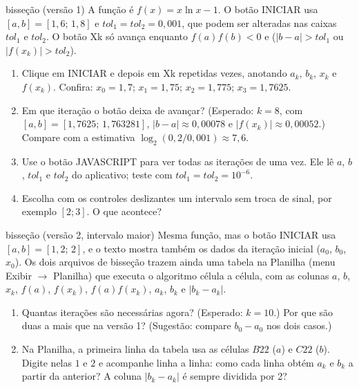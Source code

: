 \begin{atividade}{bisseção (versão 1)}{\arqBisA}
A função é $f(x)=x\ln x-1$. O botão INICIAR usa $[a,b]=[1{,}6;\,1{,}8]$ e
$tol_1=tol_2=0{,}001$, que podem ser alteradas nas caixas $tol_1$ e $tol_2$. O botão Xk só avança
enquanto $f(a)f(b)<0$ e ($|b-a|>tol_1$ ou $|f(x_k)|>tol_2$).
\begin{enumerate}[nosep]
  \item Clique em INICIAR e depois em Xk repetidas vezes, anotando $a_k$, $b_k$, $x_k$ e
        $f(x_k)$. Confira: $x_0=1{,}7$; $x_1=1{,}75$; $x_2=1{,}775$; $x_3=1{,}7625$.
  \item Em que iteração o botão deixa de avançar? (Esperado: $k=8$, com $[a,b]=[1{,}7625;\,1{,}763281]$,
        $|b-a|\approx0{,}00078$ e $|f(x_k)|\approx0{,}00052$.) Compare com a estimativa
        $\log_2(0{,}2/0{,}001)\approx7{,}6$.
  \item Use o botão JAVASCRIPT para ver todas as iterações de uma vez. Ele lê $a$, $b$, $tol_1$ e
        $tol_2$ do aplicativo; teste com $tol_1=tol_2=10^{-6}$.
  \item Escolha com os controles deslizantes um intervalo sem troca de sinal, por exemplo
        $[2;3]$. O que acontece?
\end{enumerate}
\end{atividade}

\begin{atividade}{bisseção (versão 2, intervalo maior)}{\arqBisB}
Mesma função, mas o botão INICIAR usa $[a,b]=[1{,}2;\,2]$, e o texto mostra também os dados da
iteração inicial ($a_0$, $b_0$, $x_0$). Os dois arquivos de bisseção trazem ainda uma tabela na
Planilha (menu Exibir $\to$ Planilha) que executa o algoritmo célula a célula, com as colunas
$a$, $b$, $x_k$, $f(a)$, $f(x_k)$, $f(a)f(x_k)$, $a_k$, $b_k$ e $|b_k-a_k|$.
\begin{enumerate}[nosep]
  \item Quantas iterações são necessárias agora? (Esperado: $k=10$.) Por que são duas a mais que na
        versão 1? (Sugestão: compare $b_0-a_0$ nos dois casos.)
  \item Na Planilha, a primeira linha da tabela usa as células $B22$ ($a$) e $C22$ ($b$). Digite
        nelas $1$ e $2$ e acompanhe linha a linha: como cada linha obtém $a_k$ e $b_k$ a partir da
        anterior? A coluna $|b_k-a_k|$ é sempre dividida por 2?
\end{enumerate}
\end{atividade}

